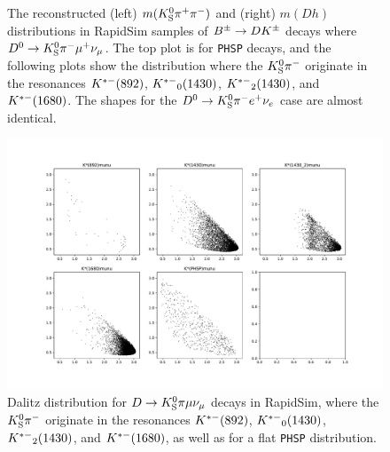 \begin{figure}[tbp]
    \caption{The reconstructed (left) $m({{K}^0_{\mathrm{S}}} \pi^+ \pi^-)$ and (right) $m(Dh)$ distributions in RapidSim samples of ${{B}^\pm}\rightarrow{\ensuremath{D}} {\ensuremath{{K}^\pm}}$ decays where ${{D}^0}\rightarrow{\ensuremath{{K}^0_{\mathrm{S}}}}\pi^-\mu^+\nu_\mu$. The top plot is for \texttt{PHSP} decays, and the following plots show the distribution where the ${{K}^0_{\mathrm{S}}}{{\pi}^-}$ originate in the resonances ${{K}^{*-}}(892)$, ${{K}^{*-}}_0(1430)$, ${{K}^{*-}}_2(1430)$, and ${{K}^{*-}}(1680)$. The shapes for the ${{D}^0}\rightarrow{\ensuremath{{K}^0_{\mathrm{S}}}}\pi^-e^+\nu_e$ case are almost identical.}
    \label{fig:semileptonic_D_decays_kspp}
\end{figure}

\begin{figure}[tb]
    \centering
    \includegraphics[width=0.9\columnwidth]{figures/analysis/semileptonic_bkgs/Dalitz_distributions_D2Kstmunu.pdf}
    \caption{Dalitz distribution for ${D}\rightarrow{\ensuremath{{K}^0_{\mathrm{S}}}}\pi\mu\nu_\mu$ decays in RapidSim, where the ${{K}^0_{\mathrm{S}}}{{\pi}^-}$ originate in the resonances ${{K}^{*-}}(892)$, ${{K}^{*-}}_0(1430)$, ${{K}^{*-}}_2(1430)$, and ${{K}^{*-}}(1680)$, as well as for a flat \texttt{PHSP} distribution.}
    \label{fig:d2kstmunu_dalits}
\end{figure}

